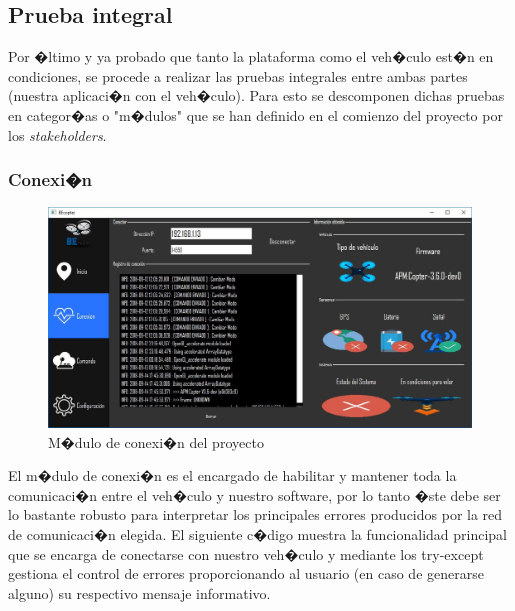 \newpage

\subsection{Prueba integral}
Por �ltimo y ya probado que tanto la plataforma como el veh�culo est�n en condiciones, se procede a realizar las pruebas integrales entre ambas partes (nuestra aplicaci�n con el veh�culo). Para esto se descomponen dichas pruebas en categor�as o "m�dulos" que se han definido en el comienzo del proyecto por los \textit{stakeholders}.


\subsubsection{Conexi�n }
\begin{figure}[h!]
	\centering
	\includegraphics[width=0.7\linewidth, height=0.2\textheight]{Imagenes/pConexion}
	\caption{M�dulo de conexi�n del proyecto}
	\label{fig:pconexion}
\end{figure}

El m�dulo de conexi�n es el encargado de habilitar y mantener toda la comunicaci�n entre el veh�culo y nuestro software, por lo tanto �ste debe ser lo bastante robusto para interpretar los principales errores producidos por la red de comunicaci�n elegida. El siguiente c�digo muestra la funcionalidad principal que se encarga de conectarse con nuestro veh�culo y mediante los try-except gestiona el control de errores proporcionando al usuario (en caso de generarse alguno) su respectivo mensaje informativo.

